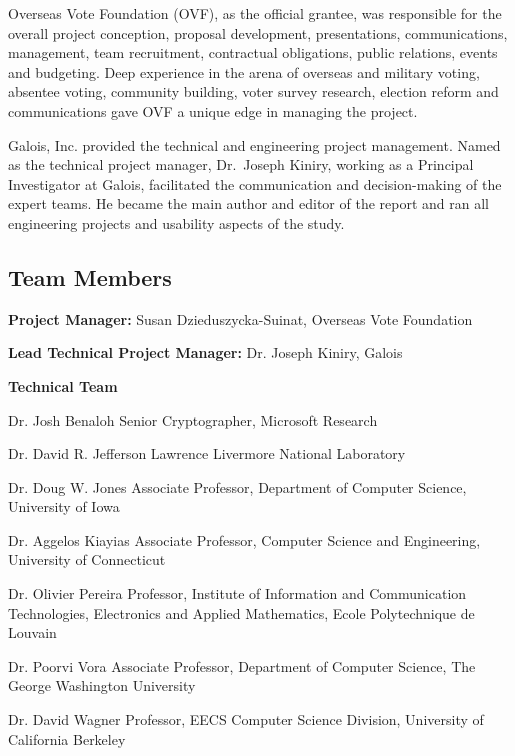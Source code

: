 Overseas Vote Foundation (OVF), as the official grantee, was
responsible for the overall project conception, proposal development,
presentations, communications, management, team recruitment,
contractual obligations, public relations, events and budgeting. Deep
experience in the arena of overseas and military voting, absentee
voting, community building, voter survey research, election reform and
communications gave OVF a unique edge in managing the project.

Galois, Inc. provided the technical and engineering project
management. Named as the technical project manager, Dr.~Joseph Kiniry,
working as a Principal Investigator at Galois, facilitated the
communication and decision-making of the expert teams. He became the
main author and editor of the report and ran all engineering projects
and usability aspects of the study.

\subsection{Team Members}
\label{sec:team-members}


\textbf{Project Manager:} Susan Dzieduszycka-Suinat, Overseas Vote Foundation

\textbf{Lead Technical Project Manager:} Dr. Joseph Kiniry, Galois

\textbf{Technical Team}

Dr. Josh Benaloh
Senior Cryptographer, Microsoft Research
 
Dr. David R. Jefferson
Lawrence Livermore National Laboratory
 
Dr. Doug W. Jones
Associate Professor, Department of Computer Science, University of Iowa
 
Dr. Aggelos Kiayias
Associate Professor, Computer Science and Engineering, University of Connecticut
 
Dr. Olivier Pereira
Professor, Institute of Information and Communication Technologies, Electronics and Applied Mathematics, Ecole Polytechnique de Louvain
 
Dr. Poorvi Vora
Associate Professor, Department of Computer Science, The George Washington University
 
Dr. David Wagner
Professor, EECS Computer Science Division, University of California Berkeley
 
